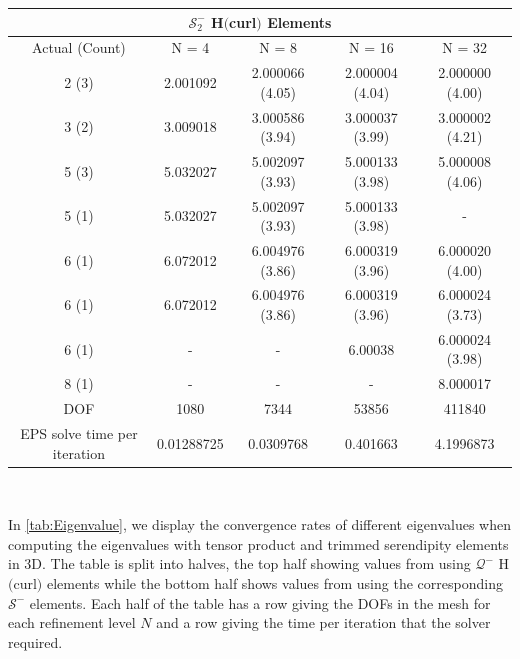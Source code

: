 \documentclass[format=acmsmall,screen,timestamp=false,a4paper]{acmart}
\begin{document}
\begin{table}[htbp]
\begin{tabular}{ c c c c c }
\multicolumn{5}{c}{$\mathcal{S}^-_2$ H$($curl$)$ Elements} \\
\hline
Actual (Count) & N = 4 & N = 8 & N = 16 & N = 32 \\ 
\hline
2 (3) & 2.001092 & 2.000066 (4.05) & 2.000004 (4.04) & 2.000000 (4.00) \\  
3 (2) & 3.009018 & 3.000586 (3.94) & 3.000037 (3.99) & 3.000002 (4.21) \\
5 (3) & 5.032027 & 5.002097 (3.93)& 5.000133 (3.98) & 5.000008 (4.06) \\
5 (1) & 5.032027 & 5.002097 (3.93) & 5.000133 (3.98) & - \\
6 (1) & 6.072012 & 6.004976 (3.86) & 6.000319 (3.96) & 6.000020 (4.00) \\
6 (1) & 6.072012 & 6.004976 (3.86) & 6.000319 (3.96) & 6.000024 (3.73)\\
6 (1) & - & - & 6.00038 & 6.000024 (3.98)\\
8 (1) & - & - & - & 8.000017 \\
\hline
DOF  & 1080 & 7344 & 53856 & 411840 \\
\hline
EPS solve time per iteration & 0.01288725 & 0.0309768 & 0.401663 & 4.1996873 \\
\hline
\end{tabular}\\[0.5em]


\end{table}

In \cref{tab:Eigenvalue}, we display the convergence rates of different eigenvalues when computing the eigenvalues with tensor product and trimmed serendipity elements in 3D.  The table is split into halves, the top half showing values from using $\mathcal{Q}^-$ H$($curl$)$ elements while the bottom half shows values from using the corresponding $\mathcal{S}^-$ elements.  Each half of the table has a row giving the DOFs in the mesh for each refinement level $N$ and a row giving the time per iteration that the solver required.  
\end{document}
